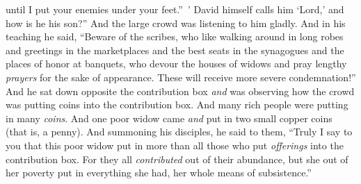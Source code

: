 \begin{biblechapter}
until I put your enemies 
under your feet.” ’
\verse David himself calls him ‘Lord,’ and how is he his son?” And the large crowd was listening to him gladly.
 And in his teaching he said, “Beware of the scribes, who like walking around in long robes and greetings in the marketplaces
\verse and the best seats in the synagogues and the places of honor at banquets,
\verse who devour the houses of widows and pray lengthy \textit{prayers} for the sake of appearance. These will receive more severe condemnation!”
 And he sat down opposite the contribution box \textit{and} was observing how the crowd was putting coins into the contribution box. And many rich people were putting in many \textit{coins}.
\verse And one poor widow came \textit{and} put in two small copper coins (that is, a penny).
\verse And summoning his disciples, he said to them, “Truly I say to you that this poor widow put in more than all those who put \textit{offerings} into the contribution box.
\verse For they all \textit{contributed} out of their abundance, but she out of her poverty put in everything she had, her whole means of subsistence.”
\end{biblechapter}

